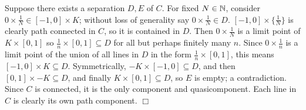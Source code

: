 \documentclass{article}
\begin{document}
\begin{enumerate}
\begin{enumerate}
        Suppose there exists a separation $D, E$ of $C$. For fixed $N \in \mathbb{N}$, consider $0 \times \frac1N \in [-1, 0] \times K$; without loss of generality say $0 \times \frac1N \in D$. $[-1, 0] \times \{\frac1N\}$ is clearly path connected in $C$, so it is contained in $D$. Then $0 \times \frac1N$ is a limit point of $K \times [0, 1]$ so $\frac1n \times [0, 1] \subseteq D$ for all but perhaps finitely many $n$. Since $0 \times \frac1n$ is a limit point of the union of all lines in $D$ in the form $\frac1n \times [0, 1]$, this means $[-1, 0] \times K \subseteq D$. Symmetrically, $-K \times [-1, 0] \subseteq D$, and then $[0, 1] \times -K \subseteq D$, and finally $K \times [0, 1] \subseteq D$, so $E$ is empty; a contradiction. Since $C$ is connected, it is the only component and quasicomponent. Each line in $C$ is clearly its own path component. $\Box$
    \end{enumerate}
\end{enumerate}
\end{document}
